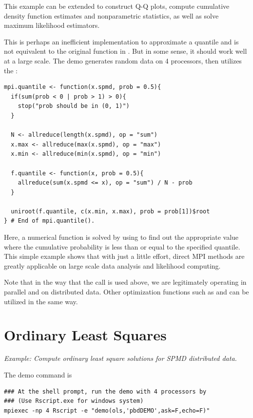 This example can be extended to construct Q-Q plots, compute cumulative density function estimates and nonparametric statistics, as well as solve maximum likelihood estimators.

This is perhaps an inefficient implementation to approximate a quantile and is not equivalent to the original  function in
. But in some sense, it should work well at a large scale.
The demo generates random data on 4 processors, then
utilizes the :
\begin{lstlisting}[language=rr,title=R Code]
mpi.quantile <- function(x.spmd, prob = 0.5){
  if(sum(prob < 0 | prob > 1) > 0){
    stop("prob should be in (0, 1)")
  }

  N <- allreduce(length(x.spmd), op = "sum")
  x.max <- allreduce(max(x.spmd), op = "max")
  x.min <- allreduce(min(x.spmd), op = "min")

  f.quantile <- function(x, prob = 0.5){
    allreduce(sum(x.spmd <= x), op = "sum") / N - prob
  }

  uniroot(f.quantile, c(x.min, x.max), prob = prob[1])$root
} # End of mpi.quantile().
\end{lstlisting}
Here, a numerical function is solved by using  to find out
the appropriate value where the cumulative probability is less than
or equal to the specified quantile.  This simple example shows that with just a little effort, direct MPI methods are greatly applicable on large scale data analysis and likelihood computing.

Note that in the way that the  call is used above, we are legitimately operating in parallel and on distributed
data.  Other optimization functions such as  and 
can be utilized in the same way.


\section[Ordinary Least Squares]{Ordinary Least Squares}
\label{sec:ols}

\emph{Example:  Compute ordinary least square solutions for SPMD distributed data.}

The demo command is
\begin{lstlisting}
### At the shell prompt, run the demo with 4 processors by
### (Use Rscript.exe for windows system)
mpiexec -np 4 Rscript -e "demo(ols,'pbdDEMO',ask=F,echo=F)"
\end{lstlisting}

